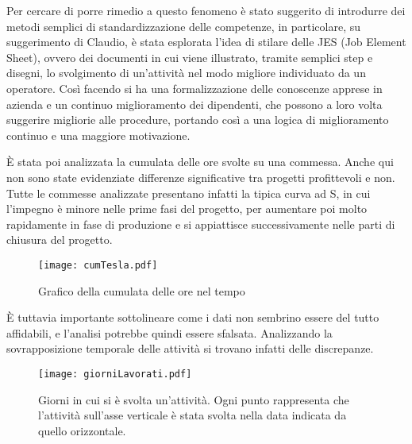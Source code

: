 \begin{multicols}{2}
	Per cercare di porre rimedio a questo fenomeno è stato suggerito di introdurre dei metodi semplici di standardizzazione delle competenze, in particolare, su suggerimento di Claudio, è stata esplorata l’idea di stilare delle JES (Job Element Sheet), ovvero dei documenti in cui viene illustrato, tramite semplici step e disegni, lo svolgimento di un’attività nel modo migliore individuato da un operatore. Così facendo si ha una formalizzazione delle conoscenze apprese in azienda e un continuo miglioramento dei dipendenti, che possono a loro volta suggerire migliorie alle procedure, portando così a una logica di miglioramento continuo e una maggiore motivazione.

	È stata poi analizzata la cumulata delle ore svolte su una commessa. Anche qui non sono state evidenziate differenze significative tra progetti profittevoli e non. Tutte le commesse analizzate presentano infatti la tipica curva ad S, in cui l’impegno è minore nelle prime fasi del progetto, per aumentare poi molto rapidamente in fase di produzione e si appiattisce successivamente nelle parti di chiusura del progetto.
\end{multicols}

\begin{figure}[H]
	\centering
	\texttt{[image: cumTesla.pdf]}
	\caption{Grafico della cumulata delle ore nel tempo}
\end{figure}

\begin{multicols}{2}
	È tuttavia importante sottolineare come i dati non sembrino essere del tutto affidabili, e l'analisi potrebbe quindi essere sfalsata. Analizzando la sovrapposizione temporale delle attività si trovano infatti delle discrepanze.
\end{multicols}

\begin{figure}[H]
	\centering
	\texttt{[image: giorniLavorati.pdf]}
	\caption{Giorni in cui si è svolta un'attività. Ogni punto rappresenta che l'attività sull'asse verticale è stata svolta nella data indicata da quello orizzontale.}
\end{figure}

